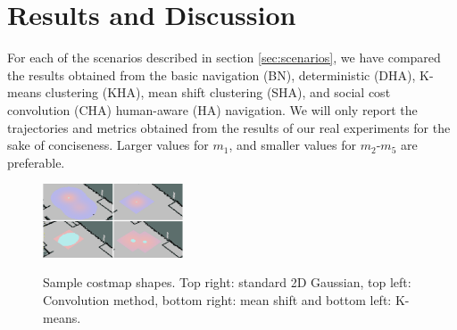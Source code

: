 \section{Results and Discussion}
\label{res}

For each of the scenarios described in section \ref{sec:scenarios}, we have compared the results obtained from the basic navigation (BN), deterministic (DHA), K-means clustering (KHA), mean shift clustering (SHA), and social cost convolution (CHA) human-aware (HA) navigation. We will only report the trajectories and metrics obtained from the results of our real experiments for the sake of conciseness. Larger values for $m_{1}$, and smaller values for $m_{2}$-$m_{5}$ are preferable.


\begin{figure}
\centering
{\includegraphics[width=0.37\textwidth]{pictures/all.eps}\label{fig:costmapPic}}%

\caption{Sample costmap shapes. Top right: standard 2D Gaussian, top left: Convolution method, bottom right: mean shift and bottom left: K-means.}
\label{fig:costmapPic}
\end{figure}


